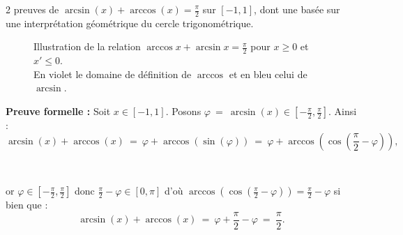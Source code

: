 \documentclass{article}
\begin{document}
\begin{question_kholle}{2 preuves de $\arcsin(x) + \arccos(x) =\frac{\pi}{2}$ sur $[-1,1]$, dont une basée sur une interprétation géométrique du cercle trigonométrique.}
\begin{figure}[H]
\begin{tikzpicture}[scale=4]
        \end{tikzpicture}
        \caption{Illustration de la relation $\arccos x + \arcsin x = \frac{\pi}{2}$ pour $x\geq 0$ et $x'\leq 0$.\\ En violet le domaine de définition de $\arccos$ et en bleu celui de $\arcsin$.}
        \label{sem6:q4:1}
    \end{figure}

    \noindent\textbf{Preuve formelle :}
    Soit $x\in [-1,1]$. Posons  $\varphi \ = \ \arcsin(x) \in \left[-\frac{\pi}{2},\frac{\pi}{2}\right]$. Ainsi :
    \[
        \arcsin(x) + \arccos(x) \ = \ \varphi + \arccos(\sin(\varphi)) \ = \ \varphi + \arccos \left( \cos \left( \frac{\pi}{2}- \varphi \right) \right),
    \]

    \

    or $\varphi \in \left[-\frac{\pi}{2},\frac{\pi}{2}\right]$ donc
    $\frac{\pi}{2}- \varphi \in [0,\pi]$ d'où $\arccos \left( \cos \left( \frac{\pi}{2}- \varphi \right) \right) = \frac{\pi}{2}- \varphi$ si bien que :
    \[
        \arcsin(x) + \arccos(x) \ = \  \varphi +\frac{\pi}{2} - \varphi \ = \ \frac{\pi}{2}.
    \]

\end{question_kholle}

\pagebreak
\end{document}
